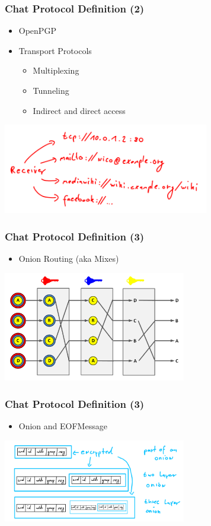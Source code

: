 \documentclass{beamer}
\begin{document}
\frame
{
  \frametitle{Chat Protocol Definition (2)}
  \begin{itemize}
      \item OpenPGP
      \item Transport Protocols
      \begin{itemize}
          \item Multiplexing
          \item Tunneling
          \item Indirect and direct access
       \end{itemize}
   \end{itemize}
  \begin{center}
   \includegraphics[width=9cm]{../addressmultiplexing.png}
  \end{center}
}

\frame
{
  \frametitle{Chat Protocol Definition (3)}
  \begin{itemize}
      \item Onion Routing (aka Mixes)
   \end{itemize}
  \begin{center}
   \includegraphics[width=8cm]{../Decryption_mix_net.png}
  \end{center}
}

\frame
{
  \frametitle{Chat Protocol Definition (3)}
  \begin{itemize}
      \item Onion and EOFMessage 
   \end{itemize}
  \begin{center}
   \includegraphics[width=8cm]{../onion.png}
  \end{center}
}
\end{document}
